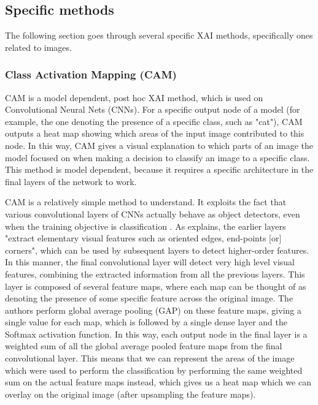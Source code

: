 \documentclass[UKenglish]{uiomasterthesis} %
\theoremstyle{definition}
\begin{document}
\subsection{Specific methods}

The following section goes through several specific XAI methods, specifically ones related to images.
\\


\subsubsection{Class Activation Mapping (CAM)}

CAM \cite{cam} is a model dependent, post hoc XAI method, which is used on Convolutional Neural Nets (CNNs). For a specific output node of a model (for example, the one denoting the presence of a specific class, such as "cat"), CAM outputs a heat map showing which areas of the input image contributed to this node. In this way, CAM gives a visual explanation to which parts of an image the model focused on when making a decision to classify an image to a specific class. This method is model dependent, because it requires a specific architecture in the final layers of the network to work.

CAM is a relatively simple method to understand. It exploits the fact that various convolutional layers of CNNs actually behave as object detectors, even when the training objective is classification \cite{cam}. As \cite{lenet5} explains, the earlier layers "extract elementary visual features such as oriented edges, end-points [or] corners", which can be used by subsequent layers to detect higher-order features. In this manner, the final convolutional layer will detect very high level visual features, combining the extracted information from all the previous layers. This layer is composed of several feature maps, where each map can be thought of as denoting the presence of some specific feature across the original image. The authors perform global average pooling (GAP) on these feature maps, giving a single value for each map, which is followed by a single dense layer and the Softmax activation function. In this way, each output node in the final layer is a weighted sum of all the global average pooled feature maps from the final convolutional layer. This means that we can represent the areas of the image which were used to perform the classification by performing the same weighted sum on the actual feature maps instead, which gives us a heat map which we can overlay on the original image (after upsampling the feature maps).
\end{document}
